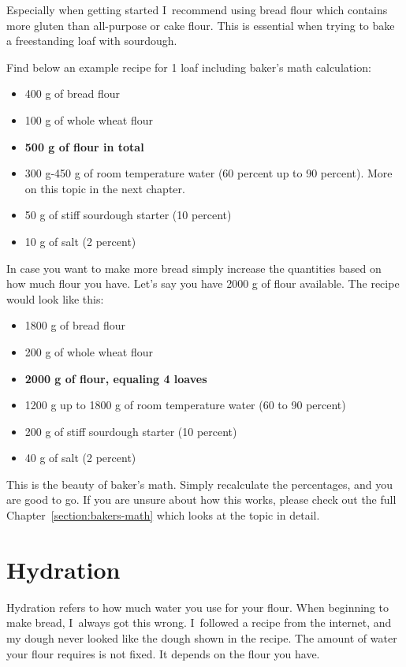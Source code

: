 Especially when getting started I~recommend using bread flour which
contains more gluten than all-purpose or cake flour. This is essential
when trying to bake a freestanding loaf with sourdough.

Find below an example recipe for 1 loaf including baker's math calculation:

\begin{itemize}
  \item 400 g of bread flour
  \item 100 g of whole wheat flour
  \item \textbf{500 g of flour in total}
  \item 300 g-450 g of room temperature water (60 percent up to 90 percent). More on
this topic in the next chapter.
  \item 50 g of stiff sourdough starter (10 percent)
  \item 10 g of salt (2 percent)
\end{itemize}

In case you want to make more bread simply increase the quantities based on
how much flour you have. Let's say you have 2000 g of flour available. The
recipe would look like this:

\begin{itemize}
  \item 1800 g of bread flour
  \item 200 g of whole wheat flour
  \item \textbf{2000 g of flour, equaling 4 loaves}
  \item 1200 g up to 1800 g of room temperature water (60 to 90 percent)
  \item 200 g of stiff sourdough starter (10 percent)
  \item 40 g of salt (2 percent)
\end{itemize}

This is the beauty of baker's math. Simply recalculate the percentages, and you
are good to go. If you are unsure about how this works, please check out the
full Chapter~\ref{section:bakers-math} which looks at the topic in detail.

\section{Hydration}

Hydration refers to how much water you use for your flour. When
beginning to make bread, I~always got this wrong. I~followed a recipe from the
internet, and my dough never looked like the dough shown in the recipe.
The amount of water your flour requires is not fixed. It depends on the flour
you have.

